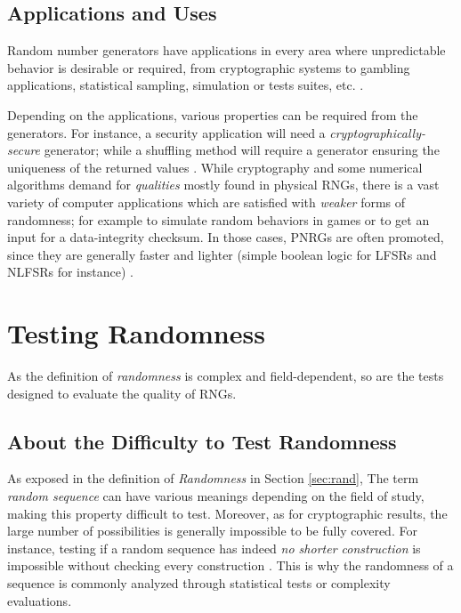 \documentclass{llncs}
\begin{document}
\subsection{Applications and Uses}

Random number generators have applications in every area where unpredictable behavior is desirable or required, from cryptographic systems to gambling applications, statistical sampling, simulation or tests suites, etc. \cite{w-rng,ray:and}.

Depending on the applications, various properties can be required from the generators. For instance, a security application will need a \emph{cryptographically-secure} generator; while a shuffling method will require a generator ensuring the uniqueness of the returned values \cite{w-rng}. While cryptography and some numerical algorithms demand for \emph{qualities} mostly found in physical RNGs, there is a vast variety of computer applications which are satisfied with \emph{weaker} forms of randomness; for example to simulate random behaviors in games or to get an input for a data-integrity checksum. In those cases, PNRGs are often promoted, since they are generally faster and lighter (simple boolean logic for LFSRs and NLFSRs for instance) \cite{w-rng,ray:and}.

\section{Testing Randomness}
\label{sec:test}

As the definition of \emph{randomness} is complex and field-dependent, so are the tests designed to evaluate the quality of RNGs.
 
\subsection{About the Difficulty to Test Randomness}

As exposed in the definition of \emph{Randomness} in Section \ref{sec:rand}, The term \textit{random sequence} can have various meanings depending on the field of study, making this property difficult to test. Moreover, as for cryptographic results, the large number of possibilities is generally impossible to be fully covered. For instance, testing if a random sequence has indeed \textit{no shorter construction} is impossible without checking every construction \cite{ritt}. 
This is why the randomness of a sequence is commonly analyzed through statistical tests or complexity evaluations.
\end{document}
